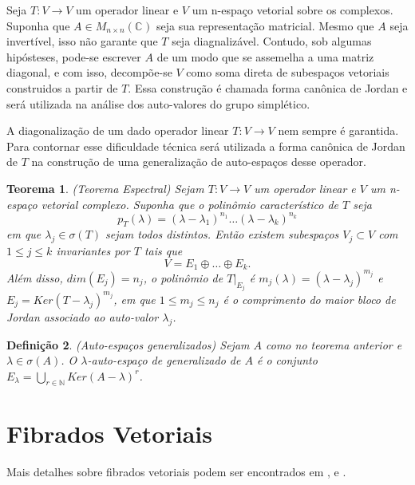 \documentclass[12pt]{book}
\newtheorem{teorema}{Teorema}[section]
\newtheorem{definicao}[teorema]{Definição}
\newcommand{\complexo}[1]{\mathbb{C}^{#1}}
\newcommand{\matrizquadcomplexa}[1]{M_{#1 \times #1}(\complexo{})}
\begin{document}
	Seja $T:V\to V$ um operador linear e $V$ um n-espaço vetorial sobre os complexos. Suponha que $A \in \matrizquadcomplexa{n}$ seja sua representação matricial. Mesmo que $A$ seja invertível, isso não garante que $T$ seja diagnalizável. Contudo, sob algumas hipósteses, pode-se escrever $A$ de um modo que se assemelha a uma matriz diagonal, e com isso, decompõe-se $V$ como soma direta de subespaços vetoriais construidos a partir de $T$. Essa construção é chamada forma canônica de Jordan e será utilizada na análise dos auto-valores do grupo simplético.
	
	A diagonalização de um dado operador linear $T:V\to V$ nem sempre é garantida. Para contornar esse dificuldade técnica será utilizada a forma canônica de Jordan de $T$ na construção de uma generalização de auto-espaços desse operador.
	
	\begin{teorema}\label{teorema_espectral_jordan}
		(Teorema Espectral) Sejam $T:V \to V$ um operador linear e $V$ um n-espaço vetorial complexo. Suponha que o polinômio característico de $T$ seja
		$$
		p_{T}(\lambda) = (\lambda - \lambda_{1})^{n_{1}}\dots (\lambda - \lambda_{k})^{n_{k}}
		$$
		em que $\lambda_{j} \in \sigma(T)$ sejam todos distintos. Então existem subespaços $V_{j} \subset V$ com $1\leq j \leq k$ invariantes por $T$ tais que 
		$$
		V = E_{1}\oplus \dots \oplus E_{k}.
		$$
		Além disso, $dim(E_{j}) = n_{j}$,  o polinômio de $T|_{E_{j}}$ é $m_{j}(\lambda) = (\lambda - \lambda_{j})^{m_{j}}$ e $E_{j} = Ker(T-\lambda_{j})^{m_{j}}$, em que $1\leq m_{j}\leq n_{j}$ é o comprimento do maior bloco de Jordan associado ao auto-valor $\lambda_{j}$.
	\end{teorema}
	
	\begin{definicao}\label{definicao_autoespaco_generalizado}
		(Auto-espaços generalizados) Sejam $A$ como no teorema anterior e $\lambda \in \sigma(A)$. O $\lambda$-auto-espaço de generalizado de $A$ é o conjunto $E_{\lambda} = \bigcup_{r \in \mathbb{N}} Ker(A - \lambda)^{r}$.
	\end{definicao}
	
	\chapter{Fibrados Vetoriais}\label{apendice_fibrados}
	
	Mais detalhes sobre fibrados vetoriais podem ser encontrados em \cite{husemoller_fibrados}, \cite{nakahara} e \cite{steenrod_fibre_bundles}.
	
\end{document}
